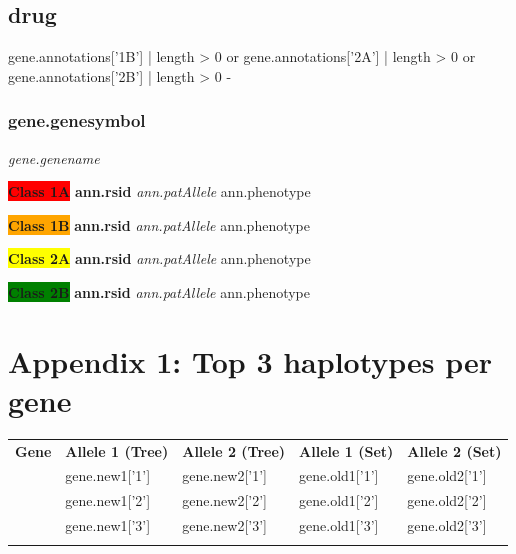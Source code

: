 \documentclass{report}
\begin{document}
{{{{{{{{{{{{%

\subsection{ {{drug}} }

{%
 gene.annotations['1B'] | length > 0 or
  gene.annotations['2A'] | length > 0  or
   gene.annotations['2B'] | length > 0 -%

\subsubsection{ {{gene.genesymbol}} }
\textit{ {{gene.genename}} } \newline

{%
\textbf{\colorbox{red} {Class 1A}} \textbf{ {{ann.rsid}} } \textit{ {{ann.patAllele}} }
{{ann.phenotype}}\newline
{%
{%
\textbf{\colorbox{orange} {Class 1B}} \textbf{ {{ann.rsid}} } \textit{ {{ann.patAllele}} }
{{ann.phenotype}}\newline
{%
{%
\textbf{\colorbox{yellow} {Class 2A}} \textbf{ {{ann.rsid}} } \textit{ {{ann.patAllele}} }
{{ann.phenotype}}\newline
{%
{%
\textbf{\colorbox{green} {Class 2B}} \textbf{ {{ann.rsid}} } \textit{ {{ann.patAllele}} }
{{ann.phenotype}}\newline
{%

{%

{%

{%

\newpage

\section{Appendix 1: Top 3 haplotypes per gene}
\scriptsize

\begin{tabularx}{\textwidth}{ X | XXXX }
\toprule
\textbf{Gene} & \textbf{Allele 1 (Tree) } & \textbf{Allele 2 (Tree)} & \textbf{Allele 1 (Set) } & \textbf{Allele 2 (Set)} \\
{%
\midrule
{{gene.symbol}}
& {{gene.new1['1']}} & {{gene.new2['1']}} & {{gene.old1['1']}} & {{gene.old2['1']}} \\
& {{gene.new1['2']}} & {{gene.new2['2']}} & {{gene.old1['2']}} & {{gene.old2['2']}}  \\
& {{gene.new1['3']}} & {{gene.new2['3']}} & {{gene.old1['3']}} & {{gene.old2['3']}} \\
{%
\bottomrule
\end{tabularx}
\normalsize
\newpage

}}}}}}}}}}}}}}}}}}}}}}}}
\end{document}
